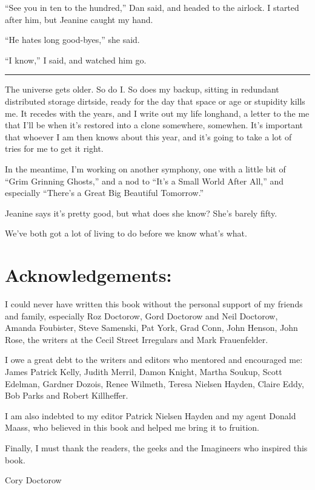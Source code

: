 “See you in ten to the hundred,” Dan said, and headed to the
airlock. I started after him, but Jeanine caught my hand.

“He hates long good-byes,” she said.

“I know,” I said, and watched him go.

\begin{center}\rule{3in}{0.4pt}\end{center}

The universe gets older. So do I. So does my backup, sitting in
redundant distributed storage dirtside, ready for the day that
space or age or stupidity kills me. It recedes with the years, and
I write out my life longhand, a letter to the me that I'll be when
it's restored into a clone somewhere, somewhen. It's important that
whoever I am then knows about this year, and it's going to take a
lot of tries for me to get it right.

In the meantime, I'm working on another symphony, one with a little
bit of “Grim Grinning Ghosts,” and a nod to “It's a Small World
After All,” and especially “There's a Great Big Beautiful
Tomorrow.”

Jeanine says it's pretty good, but what does she know? She's barely
fifty.

We've both got a lot of living to do before we know what's what.

\section{Acknowledgements:}

I could never have written this book without the personal support
of my friends and family, especially Roz Doctorow, Gord Doctorow
and Neil Doctorow, Amanda Foubister, Steve Samenski, Pat York, Grad
Conn, John Henson, John Rose, the writers at the Cecil Street
Irregulars and Mark Frauenfelder.

I owe a great debt to the writers and editors who mentored and
encouraged me: James Patrick Kelly, Judith Merril, Damon Knight,
Martha Soukup, Scott Edelman, Gardner Dozois, Renee Wilmeth, Teresa
Nielsen Hayden, Claire Eddy, Bob Parks and Robert Killheffer.

I am also indebted to my editor Patrick Nielsen Hayden and my agent
Donald Maass, who believed in this book and helped me bring it to
fruition.

Finally, I must thank the readers, the geeks and the Imagineers who
inspired this book.

Cory Doctorow

